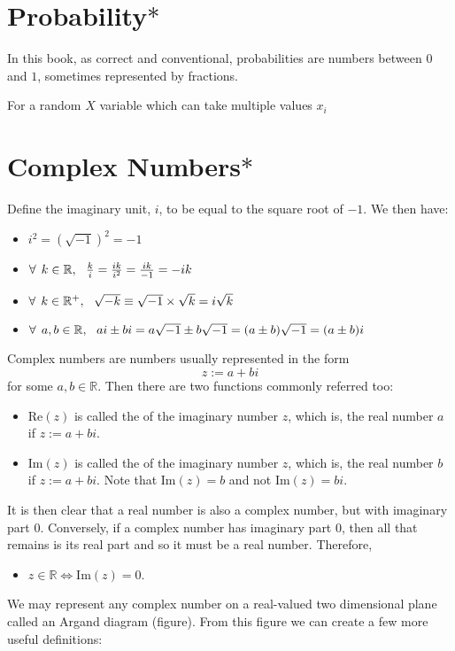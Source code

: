 \section{Probability$\ast$}
In this book, as correct and conventional, probabilities are numbers between $0$ and $1$, sometimes represented by fractions. 

For a random $X$ variable which can take multiple values $x_{i}$
\section{Complex Numbers$\ast$}
Define the imaginary unit, $i$, to be equal to the square root of $-1$. We then have:
\begin{itemize}
    \item $i^2= (\sqrt{-1})^2=-1$
    \item $\forall\:\: k \in \mathbb{R}, \:\:\: \frac{k}{i}=\frac{ik}{i^2}=\frac{ik}{-1}=-ik$
    \item $\forall\:\: k \in \mathbb{R}^+, \:\:\: \sqrt{-k}\equiv\sqrt{-1} \times \sqrt{k}=i\sqrt{k}$
    \item $\forall\:\: a,b \in \mathbb{R}, \:\:\: ai \pm bi = a\sqrt{-1}\pm b\sqrt{-1}= (a\pm b)\sqrt{-1}=(a\pm b)i$
\end{itemize}
Complex numbers are numbers usually represented in the form 
$$
z:=a+bi
$$
for some $a,b\in\mathbb{R}$. Then there are two functions commonly referred too:
\begin{itemize}
\item $\text{Re}(z)$ is called the  of the imaginary number $z$, which is, the real number $a$ if $z:=a+bi$.
\item $\text{Im}(z)$ is called the  of the imaginary number $z$, which is, the real number $b$ if $z:=a+bi$. Note that $\text{Im}(z)=b$ and not $\text{Im}(z)=bi$. 
\end{itemize}
It is then clear that a real number is also a complex number, but with imaginary part $0$. Conversely, if a complex number has imaginary part $0$, then all that remains is its real part and so it must be a real number. Therefore,
\begin{itemize}
    \item $z \in \mathbb{R} \iff \text{Im}(z)=0$.
\end{itemize}
We may represent any complex number on a real-valued two dimensional plane called an Argand diagram (figure). From this figure we can create a few more useful definitions:
